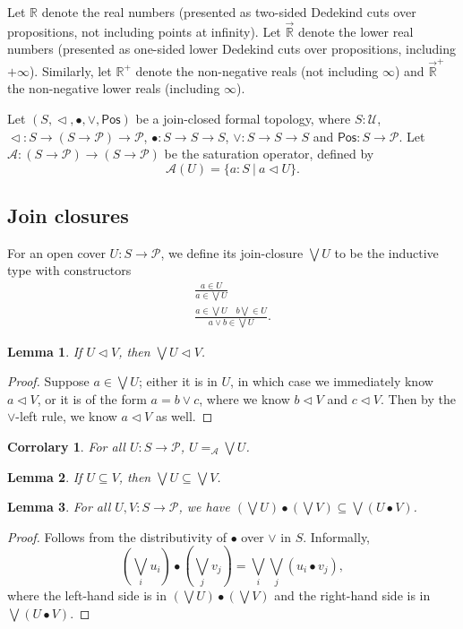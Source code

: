 \documentclass{article}           %
\newtheorem{lemma}{Lemma}
\newtheorem{corrolary}{Corrolary}
\newcommand{\R}{\mathbb{R}}
\newcommand{\lowerT}[1]{\overrightarrow{#1}}
\newcommand{\cov}{\vartriangleleft}
\newcommand{\Pos}{\mathsf{Pos}}
\newcommand{\Type}{\mathcal{U}}
\newcommand{\Prop}{\mathcal{P}}
\newcommand{\suchthat}{\ |\ }
\begin{document}
Let $\R$ denote the real numbers (presented as two-sided Dedekind cuts over propositions, not including points at infinity). Let $\lowerT{\R}$ denote the lower real numbers (presented as one-sided lower Dedekind cuts over propositions, including $+\infty$). Similarly, let $\R^+$ denote the non-negative reals (not including $\infty$) and $\lowerT{\R}^+$ the non-negative lower reals (including $\infty$).

Let $(S, \cov, \bullet, \vee, \Pos)$ be a join-closed formal topology, where $S : \Type$, $\cov : S \to (S \to \Prop) \to \Prop$, $\bullet : S \to S \to S$, $\vee : S \to S \to S$ and $\Pos : S \to \Prop$. Let $\mathcal{A} : (S \to \Prop) \to (S \to \Prop)$ be the saturation operator, defined by
\[
\mathcal{A}(U) = \{ a : S \suchthat a \cov U\}.
\]

\subsection{Join closures}
For an open cover $U : S \to \Prop$, we define its join-closure $\bigvee U$ to be the inductive type with constructors
\begin{gather*}
\frac
{a \in U}
{a \in \bigvee U}
\tag{$\bigvee$-refl}
\\
\frac
{a \in \bigvee U \quad b \bigvee \in U}
{a \vee b \in \bigvee U}.
\tag{$\bigvee$-join}
\end{gather*}

\begin{lemma}
\label{bigvee-cov}
If $U \cov V$, then $\bigvee U \cov V$.
\end{lemma}
\begin{proof}
Suppose $a \in \bigvee U$; either it is in $U$, in which case we immediately know $a \cov V$, or it is of the form $a = b \vee c$, where we know $b \cov V$ and $c \cov V$. Then by the $\vee$-left rule, we know $a \cov V$ as well.
\end{proof}

\begin{corrolary}
For all $U : S \to \Prop$, $U =_\mathcal{A} \bigvee U$.
\end{corrolary}

\begin{lemma}
\label{bigvee-subset}
If $U \subseteq V$, then $\bigvee U \subseteq \bigvee V$.
\end{lemma}

\begin{lemma}
\label{bigvee-distr}
For all $U, V : S \to \Prop$, we have $(\bigvee U) \bullet (\bigvee V) \subseteq \bigvee (U \bullet V)$.
\end{lemma}
\begin{proof}
Follows from the distributivity of $\bullet$ over $\vee$ in $S$. Informally,
\[ 
(\bigvee_i u_i) \bullet (\bigvee_j v_j)
= \bigvee_i \bigvee_j (u_i \bullet v_j),
\]
where the left-hand side is in $(\bigvee U) \bullet (\bigvee V)$ and the right-hand side is in $\bigvee (U \bullet V)$.
\end{proof}
\end{document}
